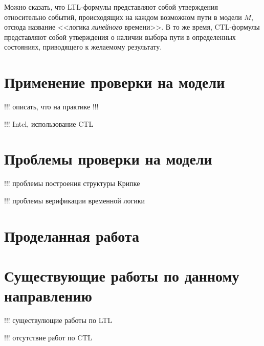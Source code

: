 \documentclass[a4paper,notitlepage,14pt]{article}
\begin{document}
Можно сказать, что LTL-формулы представляют собой утверждения относительно событий,
происходящих на каждом возможном пути в модели $M$, отсюда название <<логика
\emph{линейного} времени>>. В то же время, CTL-формулы представляют собой утверждения о
наличии выбора пути в определенных состояниях, приводящего к желаемому результату.

\section{Применение проверки на модели}
\label{sec:applications}

!!! описать, что на практике !!!

!!! Intel, использование CTL

\section{Проблемы проверки на модели}
\label{sec:problems}

!!! проблемы построения структуры Крипке

!!! проблемы верификации временной логики

\section{Проделанная работа}
\label{sec:my-work}

\section{Существующие работы по данному направлению}
\label{sec:other-work}

!!! существулющие работы по LTL

!!! отсутствие работ по CTL



\end{document}
